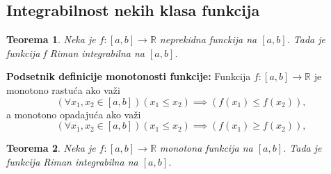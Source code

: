 \documentclass{article}
\newtheorem{teorema}{Teorema}[section]
\begin{document}
\subsection{Integrabilnost nekih klasa funkcija}
\begin{teoremabox}
    \label{teorema_2.3}
    \begin{teorema}
        Neka je $f: \left[a, b\right] \longrightarrow \mathbb{R}$ neprekidna funckija na $\left[a, b\right]$. Tada je funkcija f Riman integrabilna na $\left[a, b\right]$.
    \end{teorema}
\end{teoremabox}

\begin{defbox}
    \label{podsetnik_definicije_2}
    \textbf{Podsetnik definicije monotonosti funkcije:} Funkcija $f:\left[a,b\right]\longrightarrow\mathbb{R}$
    je monotono rastuća ako važi
    $$\left(\forall x_1,x_2\in\left[a,b\right]\right)\left(x_1\leq x_2\right)\implies \left(f\left(x_1\right)\leq f\left(x_2\right)\right),$$
    a monotono opadajuća ako važi
    $$\left(\forall x_1,x_2\in\left[a,b\right]\right)\left(x_1\leq x_2\right)\implies \left(f\left(x_1\right)\geq f\left(x_2\right)\right),$$
\end{defbox}

\begin{teoremabox}
    \label{teorema_2.4}
    \begin{teorema}
        Neka je $f: \left[a, b\right] \longrightarrow \mathbb{R}$ monotona funkcija na $\left[a, b\right]$. Tada je funkcija Riman integrabilna na $\left[a, b\right]$.
    \end{teorema}
\end{teoremabox}
\end{document}

